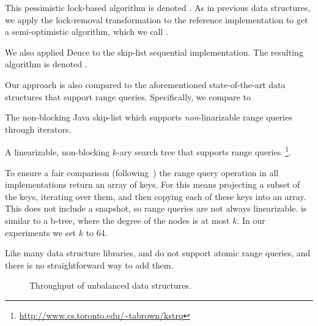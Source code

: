 This pessimistic lock-based algorithm is denoted \domSkiplist.
As in previous data structures, we  apply the lock-removal transformation to the
reference implementation to get a semi-optimistic algorithm, which we call
\autoSkiplist.

We also applied Deuce to the skip-list sequential implementation. The resulting algorithm is denoted \stmSkiplist.

Our approach is also compared to the aforementioned
state-of-the-art data structures that support range queries. Specifically,
we compare \autoSkiplist to 
\begin{description}
\setlength{\itemsep}{0pt}
\setlength{\parskip}{0pt}
\item[\skiplist] The non-blocking Java skip-list which supports \emph{non}-linarizable range queries through iterators.
\item[\kary] A linearizable, non-blocking $k$-ary search tree
that supports range queries~\cite{BrownA12}\footnote{\url{http://www.cs.toronto.edu/~tabrown/kstrq}}.
\end{description}
To ensure a fair comparison (following~\cite{BrownA12}) the range query operation in all implementations return an array of keys.
For \skiplist this means projecting a subset of the keys, iterating over them, and then copying each of these keys into an array. This does not include a snapshot, so range queries are
not always linearizable. \kary is similar to a b-tree, where the degree of the nodes is at most $k$. In our experiments we set $k$ to 64.

Like many data structure libraries, \friendly and \danaAVL
do not support atomic range queries, and
there is no straightforward way to add them.



% 


\begin{figure*}
\begin{center}

\end{center}
\caption{Throughput of unbalanced data structures.}
\label{evaluation:results:unbalanced}
\end{figure*}

